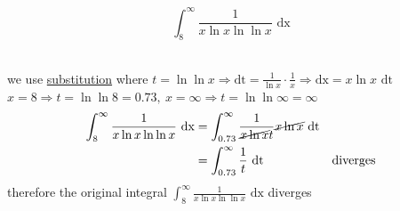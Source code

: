 \documentclass[a4paper,12pt]{article}
\newcommand{\?}{\stackrel{?}{=}}
\begin{document}
\begin{definition}
\begin{question}
\[
  \int_8^{\infty} \frac{1}{x\ln x\ln\ln x} \text{ dx}
\]\\[0pt]
\begin{answer}
we use \hyperref[sec:orgf2294be]{substitution} where \(t = \ln\ln x \Rightarrow \text{dt} = \frac{1}{\ln x} \cdot \frac1x \Rightarrow \text{dx} = x\ln x \text{ dt}\)\\[0pt]
\(x = 8 \Rightarrow t = \ln\ln8 = 0.73,\ x = \infty \Rightarrow t = \ln\ln\infty = \infty\)\\[0pt]
\begin{align*}
  \int_8^{\infty} \frac{1}{x\ln x\ln\ln x} \text{ dx} &= \int_{0.73}^\infty \frac1{\cancel{x\ln x}t} \cancel{x\ln x} \text{ dt}\\
  &= \int_{0.73}^\infty \frac1t \text{ dt} &\text{diverges}
\end{align*}
therefore the original integral \(\int_8^{\infty} \frac{1}{x\ln x\ln\ln x} \text{ dx}\) diverges\\[0pt]
\end{answer}
\end{question}
\end{definition}
\end{document}
